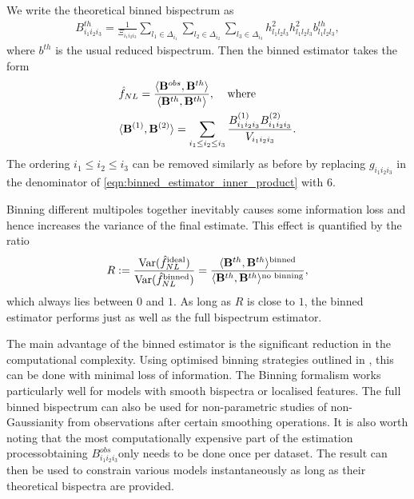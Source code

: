 We write the theoretical binned bispectrum as
\begin{align}
	B^{th}_{i_1 i_2 i_3} =  \frac{1}{\Xi_{i_1 i_2 i_3}} \sum_{l_1 \in \Delta_{i_1}} \sum_{l_2 \in \Delta_{i_2}} \sum_{l_3 \in \Delta_{i_3}} h^2_{l_1 l_2 l_3} h^2_{l_1 l_2 l_3} b^{th}_{l_1 l_2 l_3}, \label{eqn:binned_estimator_theoretical_bispectra}
\end{align}
where $b^{th}$ is the usual reduced bispectrum. Then the binned estimator takes the form
\begin{align}
	&\hat{f}_{NL} = \frac{\langle \mathbf{B}^{obs}, \mathbf{B}^{th} \rangle}{\langle \mathbf{B}^{th}, \mathbf{B}^{th} \rangle}, \;\;\;\;\text{where} \\
	&\langle \mathbf{B}^{(1)}, \mathbf{B}^{(2)} \rangle = \sum_{i_1 \le i_2 \le i_3} \frac{B^{(1)}_{i_1 i_2 i_3} B^{(2)}_{i_1 i_2 i_3}}{V_{i_1 i_2 i_3}}. \label{eqn:binned_estimator_inner_product}
\end{align}
The ordering $i_1 \le i_2 \le i_3$ can be removed similarly as before by replacing $g_{i_1 i_2 i_3}$ in the denominator of \eqref{eqn:binned_estimator_inner_product} with $6$.

Binning different multipoles together inevitably causes some information loss and hence increases the variance of the final estimate. This effect is quantified by the ratio
\begin{align}
	R := \frac{\text{Var}(\hat{f}^\text{ideal}_{NL})}{\text{Var}(\hat{f}^\text{binned}_{NL})} = \frac{\langle \mathbf{B}^{th}, \mathbf{B}^{th} \rangle^\text{binned}}{\langle \mathbf{B}^{th}, \mathbf{B}^{th} \rangle^\text{no binning}}, 
\end{align}
which always lies between $0$ and $1$. As long as $R$ is close to $1$, the binned estimator performs just as well as the full bispectrum estimator.

The main advantage of the binned estimator is the significant reduction in the computational complexity. Using optimised binning strategies outlined in \cite{Bucher2016}, this can be done with minimal loss of information. The Binning formalism works particularly well for models with smooth bispectra or localised features. The full binned bispectrum can also be used for non-parametric studies of non-Gaussianity from observations after certain smoothing operations. It is also worth noting that the most computationally expensive part of the estimation process\textemdash obtaining $B^{obs}_{i_1 i_2 i_3}$\textemdash only needs to be done once per dataset. The result can then be used to constrain various models instantaneously as long as their theoretical bispectra are provided.

